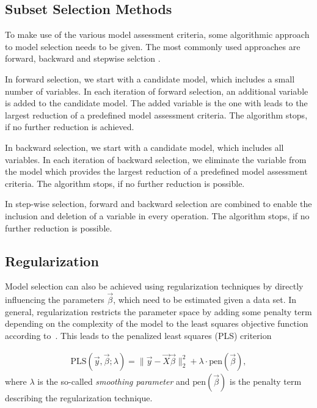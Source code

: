 \subsection{Subset Selection Methods} \label{subsec:SSM}

To make use of the various model assessment criteria, some algorithmic approach to model selection needs to be given. The most commonly used approaches are forward, backward and stepwise selction \cite{fahrmeir2007regression}. 

In forward selection, we start with a candidate model, which includes a small number of variables. In each iteration of forward selection, an additional variable is added to the candidate model.  The added variable is the one with leads to the largest reduction of a predefined model assessment criteria. The algorithm stops, if no further reduction is achieved.

In backward selection, we start with a candidate model, which includes all variables. In each iteration of backward selection, we eliminate the variable from the model which provides the largest reduction of a predefined model assessment criteria. The algorithm stops, if no further reduction is possible. 

In step-wise selection, forward and backward selection are combined to enable the inclusion and deletion of a variable in every operation. The algorithm stops, if no further reduction is possible.

\subsection{Regularization} \label{subsec:Regularization}

Model selection can also be achieved using regularization techniques by directly influencing the parameters $\vec{\beta}$, which need to be estimated given a data set. In general, regularization restricts the parameter space by adding some penalty term depending on the complexity of the model to the least squares objective function according to~. This leads to the penalized least squares (PLS) criterion

\begin{align} \label{eq:PLS_crit}
	\text{PLS}(\vec{y}, \vec{\beta}; \lambda) = \lVert \vec{y} - \vec{X} \vec{\beta}\rVert^2_2 + \lambda \cdot \text{pen}(\vec{\beta}),
\end{align}
%
where $\lambda$ is the so-called \emph{smoothing parameter} and $\text{pen}(\vec{\beta})$ is the penalty term describing the regularization technique. 

